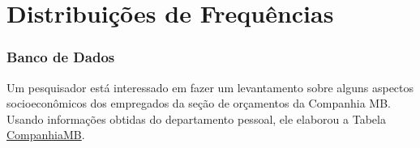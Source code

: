 \documentclass[12pt]{beamer}
\begin{document}
\section{Distribuições de Frequências}
\begin{frame}{}
\frametitle{Banco de Dados}
\begin{block}{}
\justifying
Um pesquisador está interessado em fazer um levantamento sobre alguns aspectos socioeconômicos dos empregados da seção de orçamentos da Companhia MB. Usando informações obtidas do departamento pessoal, ele elaborou a Tabela \href{https://raw.githack.com/maf105/maf105.github.io/master/Aulas_MAF105/Aula1/CompanhiaMB.html}{CompanhiaMB}.
\end{block}
\end{frame}


\end{document}
